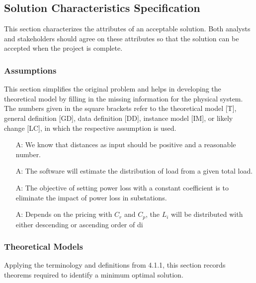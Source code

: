 \documentclass[12pt]{article}
\newcounter{assumpnum} %
\begin{document}
\subsection{Solution Characteristics Specification}

 {This section characterizes the attributes of an acceptable solution. Both analysts and stakeholders should agree on these attributes so that the solution can be accepted when the project is complete.}


\subsubsection{Assumptions} \label{sec_assumpt}


This section simplifies the original problem and helps in developing the
theoretical model by filling in the missing information for the physical
system. The numbers given in the square brackets refer to the theoretical model
[T], general definition [GD], data definition [DD], instance model [IM], or
likely change [LC], in which the respective assumption is used.
\begin{itemize}

\item[A\refstepcounter{assumpnum}\theassumpnum \label{as:n}:]
  We know that distances as input should be positive and a reasonable number.

\item[A\refstepcounter{assumpnum}\theassumpnum \label{as:approximate}:]
  The software will estimate the distribution of load from a given total load. 


\item[A\refstepcounter{assumpnum}\theassumpnum \label{as:sixterm}:]
  The objective of setting power loss with a constant coefficient is to eliminate the impact of power loss in substations.
\item[A\refstepcounter{assumpnum}\theassumpnum \label{A_meaningfulLabel}:]
  {Depends on the pricing with $C_r$ and $C_p$,  the $L_i$ will be distributed with either descending or ascending order of di }

\end{itemize}

\subsubsection{Theoretical Models}\label{TM-series-cauchy-condition}
Applying the terminology and definitions from 4.1.1, this section records
theorems required to identify a minimum optimal solution.
\end{document}
